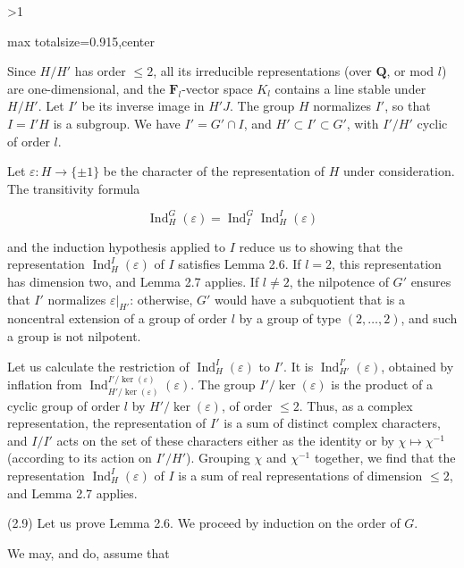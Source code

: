 \documentclass[9pt,twoside]{extarticle}
\newcommand{\EditionPage}[3]{%
  \ifnum#1>1\clearpage\fi
  \pdfbookmark[1]{Printed folio #2}{en-folio-#2}%
  \hypertarget{en-page-#1}{}%
  \noindent\begin{adjustbox}{max totalsize={\textwidth}{0.915\textheight},center}
  \begin{minipage}[t]{\textwidth}
  \fontsize{8.45}{10.05}\selectfont\justifying
  #3
  \end{minipage}
  \end{adjustbox}%
}
\begin{document}
\EditionPage{8}{306}{%
Since \(H/H'\) has order \(\leq2\), all its irreducible representations (over \(\mathbf Q\), or mod \(l\)) are one-dimensional, and the \(\mathbf F_l\)-vector space \(K_l\) contains a line stable under \(H/H'\). Let \(I'\) be its inverse image in \(H'J\). The group \(H\) normalizes \(I'\), so that \(I=I'H\) is a subgroup. We have \(I'=G'\cap I\), and \(H'\subset I'\subset G'\), with \(I'/H'\) cyclic of order \(l\).\par

Let \(\varepsilon:H\to\{\pm1\}\) be the character of the representation of \(H\) under consideration. The transitivity formula\par

\[
\operatorname{Ind}_H^G(\varepsilon)=\operatorname{Ind}_I^G\operatorname{Ind}_H^I(\varepsilon)
\]

and the induction hypothesis applied to \(I\) reduce us to showing that the representation \(\operatorname{Ind}_H^I(\varepsilon)\) of \(I\) satisfies Lemma 2.6. If \(l=2\), this representation has dimension two, and Lemma 2.7 applies. If \(l\neq2\), the nilpotence of \(G'\) ensures that \(I'\) normalizes \(\varepsilon|_{H'}\): otherwise, \(G'\) would have a subquotient that is a noncentral extension of a group of order \(l\) by a group of type \((2,\ldots,2)\), and such a group is not nilpotent.\par

Let us calculate the restriction of \(\operatorname{Ind}_H^I(\varepsilon)\) to \(I'\). It is \(\operatorname{Ind}_{H'}^{I'}(\varepsilon)\), obtained by inflation from \(\operatorname{Ind}_{H'/\ker(\varepsilon)}^{I'/\ker(\varepsilon)}(\varepsilon)\). The group \(I'/\ker(\varepsilon)\) is the product of a cyclic group of order \(l\) by \(H'/\ker(\varepsilon)\), of order \(\leq2\). Thus, as a complex representation, the representation of \(I'\) is a sum of distinct complex characters, and \(I/I'\) acts on the set of these characters either as the identity or by \(\chi\mapsto\chi^{-1}\) (according to its action on \(I'/H'\)). Grouping \(\chi\) and \(\chi^{-1}\) together, we find that the representation \(\operatorname{Ind}_H^I(\varepsilon)\) of \(I\) is a sum of real representations of dimension \(\leq2\), and Lemma 2.7 applies.\par

(2.9) Let us prove Lemma 2.6. We proceed by induction on the order of \(G\).\par

We may, and do, assume that\par

}
\end{document}
